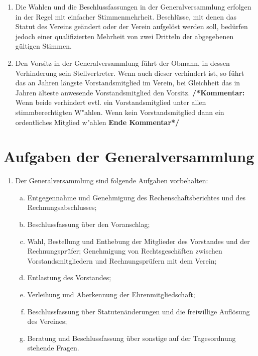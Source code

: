\documentclass[a4paper,12pt]{article}
\newcommand{\comment}[1]{{\bf /*Kommentar:} #1 {\bf Ende Kommentar*/}}
\begin{document}
\begin{enumerate}
\item Die Wahlen und die Beschlussfassungen in der Generalversammlung erfolgen in der Regel mit einfacher Stimmenmehrheit. Beschlüsse, mit denen das Statut des Vereins geändert oder der Verein aufgelöst werden soll, bedürfen jedoch einer qualifizierten Mehrheit von zwei Dritteln der abgegebenen gültigen Stimmen.
\item Den Vorsitz in der Generalversammlung führt der Obmann, in dessen Verhinderung sein Stellvertreter. Wenn auch dieser verhindert ist, so führt das an Jahren längste Vorstandsmitglied im Verein, bei Gleichheit das in Jahren älteste anwesende Vorstandsmitglied den Vorsitz.
\comment{Wenn beide verhindert evtl. ein Vorstandsmitglied unter allen stimmberechtigten W"ahlen. Wenn kein Vorstandsmitglied dann ein ordentliches Mitglied w"ahlen}
\end{enumerate}

\section{Aufgaben der Generalversammlung} %
\begin{enumerate}
\item Der Generalversammlung sind folgende Aufgaben vorbehalten:
	\begin{enumerate}[(a)]
	\item Entgegennahme und Genehmigung des Rechenschaftsberichtes und des Rechnungsabschlusses;
	\item Beschlussfassung über den Voranschlag;
	\item Wahl, Bestellung und Enthebung der Mitglieder des Vorstandes und der Rechnungsprüfer; Genehmigung von Rechtsgeschäften zwischen Vorstandsmitgliedern und Rechnungsprüfern mit dem Verein;
	\item Entlastung des Vorstandes;
	\item Verleihung und Aberkennung der Ehrenmitgliedschaft;
	\item Beschlussfassung über Statutenänderungen und die freiwillige Auflösung des Vereines;
	\item Beratung und Beschlussfassung über sonstige auf der Tagesordnung stehende Fragen.
	\end{enumerate}
\end{enumerate}
\end{document}
